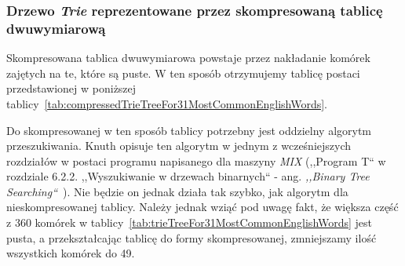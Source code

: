 	\subsubsection{Drzewo \emph{Trie} reprezentowane przez skompresowaną tablicę dwuwymiarową}\label{sec:DrzwoTrieReprezentowanePrzezSkommpresowanaTabliceDwuwymiarowa}
	
	Skompresowana tablica dwuwymiarowa powstaje przez nakładanie komórek zajętych na te, które są puste. W ten sposób otrzymujemy tablicę postaci przedstawionej w poniższej tablicy~\ref{tab:compressedTrieTreeFor31MostCommonEnglishWords}.
	
    Do skompresowanej w ten sposób tablicy potrzebny jest oddzielny algorytm przeszukiwania. Knuth opisuje ten algorytm w jednym z wcześniejszych rozdziałów w postaci programu napisanego dla maszyny \emph{MIX} (,,Program T`` w rozdziale 6.2.2. ,,Wyszukiwanie w drzewach binarnych`` - ang. \emph{,,Binary Tree Searching``}~\cite{KnuthsTheArtOfComputerProgramming3}). Nie będzie on jednak działa tak szybko, jak algorytm dla nieskompresowanej tablicy. Należy jednak wziąć pod uwagę fakt, że większa część z 360 komórek w tablicy~\ref{tab:trieTreeFor31MostCommonEnglishWords} jest pusta, a przekształcając tablicę do formy skompresowanej, zmniejszamy ilość wszystkich komórek do 49.
    

